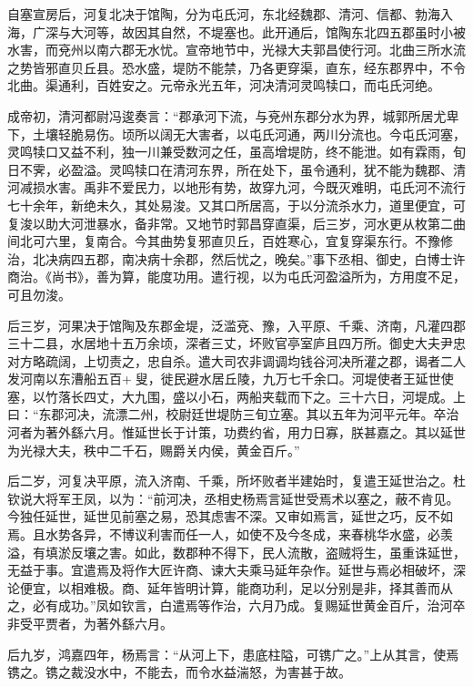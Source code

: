 \documentclass[12pt,UTF8]{ctexbook}
\begin{document}
自塞宣房后，河复北决于馆陶，分为屯氏河，东北经魏郡、清河、信都、勃海入海，广深与大河等，故因其自然，不堤塞也。此开通后，馆陶东北四五郡虽时小被水害，而兗州以南六郡无水忧。宣帝地节中，光禄大夫郭昌使行河。北曲三所水流之势皆邪直贝丘县。恐水盛，堤防不能禁，乃各更穿渠，直东，经东郡界中，不令北曲。渠通利，百姓安之。元帝永光五年，河决清河灵鸣犊口，而屯氏河绝。



成帝初，清河都尉冯逡奏言：“郡承河下流，与兗州东郡分水为界，城郭所居尤卑下，土壤轻脆易伤。顷所以阔无大害者，以屯氏河通，两川分流也。今屯氏河塞，灵鸣犊口又益不利，独一川兼受数河之任，虽高增堤防，终不能泄。如有霖雨，旬日不霁，必盈溢。灵鸣犊口在清河东界，所在处下，虽令通利，犹不能为魏郡、清河减损水害。禹非不爱民力，以地形有势，故穿九河，今既灭难明，屯氏河不流行七十余年，新绝未久，其处易浚。又其口所居高，于以分流杀水力，道里便宜，可复浚以助大河泄暴水，备非常。又地节时郭昌穿直渠，后三岁，河水更从枚第二曲间北可六里，复南合。今其曲势复邪直贝丘，百姓寒心，宜复穿渠东行。不豫修治，北决病四五郡，南决病十余郡，然后忧之，晚矣。”事下丞相、御史，白博士许商治。《尚书》，善为算，能度功用。遣行视，以为屯氏河盈溢所为，方用度不足，可且勿浚。



后三岁，河果决于馆陶及东郡金堤，泛滥兗、豫，入平原、千乘、济南，凡灌四郡三十二县，水居地十五万余顷，深者三丈，坏败官亭室庐且四万所。御史大夫尹忠对方略疏阔，上切责之，忠自杀。遣大司农非调调均钱谷河决所灌之郡，谒者二人发河南以东漕船五百+叟，徙民避水居丘陵，九万七千余口。河堤使者王延世使塞，以竹落长四丈，大九围，盛以小石，两船夹载而下之。三十六日，河堤成。上曰：“东郡河决，流漂二州，校尉廷世堤防三旬立塞。其以五年为河平元年。卒治河者为著外繇六月。惟延世长于计策，功费约省，用力日寡，朕甚嘉之。其以延世为光禄大夫，秩中二千石，赐爵关内侯，黄金百斤。”



后二岁，河复决平原，流入济南、千乘，所坏败者半建始时，复遣王延世治之。杜钦说大将军王凤，以为：“前河决，丞相史杨焉言延世受焉术以塞之，蔽不肯见。今独任延世，延世见前塞之易，恐其虑害不深。又审如焉言，延世之巧，反不如焉。且水势各异，不博议利害而任一人，如使不及今冬成，来春桃华水盛，必羡溢，有填淤反壤之害。如此，数郡种不得下，民人流散，盗贼将生，虽重诛延世，无益于事。宜遣焉及将作大匠许商、谏大夫乘马延年杂作。延世与焉必相破坏，深论便宜，以相难极。商、延年皆明计算，能商功利，足以分别是非，择其善而从之，必有成功。”凤如钦言，白遣焉等作治，六月乃成。复赐延世黄金百斤，治河卒非受平贾者，为著外繇六月。



后九岁，鸿嘉四年，杨焉言：“从河上下，患底柱隘，可镌广之。”上从其言，使焉镌之。镌之裁没水中，不能去，而令水益湍怒，为害甚于故。
\end{document}
